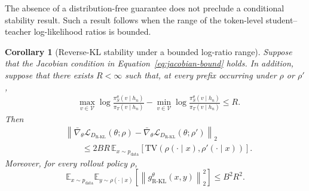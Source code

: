 \documentclass{article} %
\theoremstyle{plain}
\newtheorem{corollary}[theorem]{Corollary}
\theoremstyle{definition}
\theoremstyle{remark}
\begin{document}
The absence of a distribution-free guarantee does not preclude a conditional
stability result.  Such a result follows when the range of the token-level
student--teacher log-likelihood ratios is bounded.

\begin{corollary}[Reverse-KL stability under a bounded log-ratio range]
\label{cor:reverse-bounded-ratio}
Suppose that the Jacobian condition in
Equation~\ref{eq:jacobian-bound} holds.  In addition, suppose that there
exists $R<\infty$ such that, at every prefix occurring under $\rho$ or
$\rho'$,
\begin{align}
    &\max_{v\in\mathcal V}
    \log\frac{\pi_S^\theta(v\mid h_n)}{\pi_T(v\mid h_n)}
    -
    \min_{v\in\mathcal V}
    \log\frac{\pi_S^\theta(v\mid h_n)}{\pi_T(v\mid h_n)}
    \le R.
    \label{eq:reverse-log-ratio-range}
\end{align}
Then
\begin{align}
    &\left\lVert
        \bar\nabla_\theta
        \mathcal L_{D_{\mathrm{R\text{-}KL}}}(\theta;\rho)
        -
        \bar\nabla_\theta
        \mathcal L_{D_{\mathrm{R\text{-}KL}}}(\theta;\rho')
    \right\rVert_2\nonumber\\
    &\qquad\le
    2BR\,
    \mathbb E_{x\sim p_{\mathrm{data}}}
    \left[
        \mathrm{TV}\!\left(
            \rho(\cdot\mid x),
            \rho'(\cdot\mid x)
        \right)
    \right].
    \label{eq:reverse-rollout-stability-bounded-ratio}
\end{align}
Moreover, for every rollout policy $\rho$,
\begin{equation}
    \mathbb E_{x\sim p_{\mathrm{data}}}
    \mathbb E_{y\sim\rho(\cdot\mid x)}
    \left[
        \left\lVert
            g_{\mathrm{R\text{-}KL}}^\theta(x,y)
        \right\rVert_2^2
    \right]
    \le B^2R^2.
    \label{eq:reverse-gradient-second-moment-bounded-ratio}
\end{equation}
\end{corollary}
\end{document}
